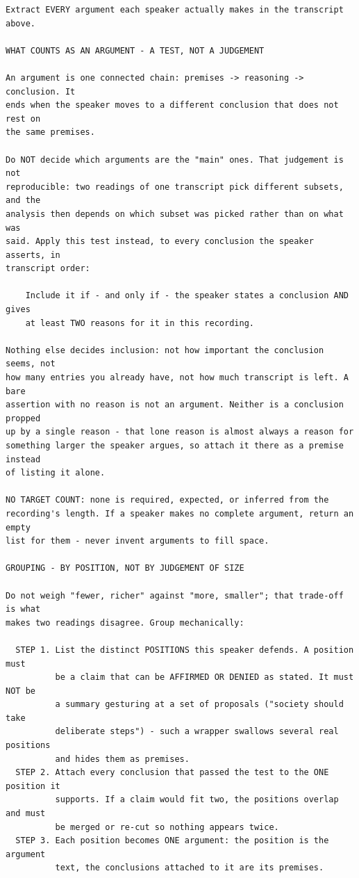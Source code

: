 \documentclass[a4paper, 12pt]{book}
\begin{document}
\begin{lstlisting}[basicstyle=\ttfamily\scriptsize,breaklines=true]
Extract EVERY argument each speaker actually makes in the transcript above.

WHAT COUNTS AS AN ARGUMENT - A TEST, NOT A JUDGEMENT

An argument is one connected chain: premises -> reasoning -> conclusion. It
ends when the speaker moves to a different conclusion that does not rest on
the same premises.

Do NOT decide which arguments are the "main" ones. That judgement is not
reproducible: two readings of one transcript pick different subsets, and the
analysis then depends on which subset was picked rather than on what was
said. Apply this test instead, to every conclusion the speaker asserts, in
transcript order:

    Include it if - and only if - the speaker states a conclusion AND gives
    at least TWO reasons for it in this recording.

Nothing else decides inclusion: not how important the conclusion seems, not
how many entries you already have, not how much transcript is left. A bare
assertion with no reason is not an argument. Neither is a conclusion propped
up by a single reason - that lone reason is almost always a reason for
something larger the speaker argues, so attach it there as a premise instead
of listing it alone.

NO TARGET COUNT: none is required, expected, or inferred from the
recording's length. If a speaker makes no complete argument, return an empty
list for them - never invent arguments to fill space.

GROUPING - BY POSITION, NOT BY JUDGEMENT OF SIZE

Do not weigh "fewer, richer" against "more, smaller"; that trade-off is what
makes two readings disagree. Group mechanically:

  STEP 1. List the distinct POSITIONS this speaker defends. A position must
          be a claim that can be AFFIRMED OR DENIED as stated. It must NOT be
          a summary gesturing at a set of proposals ("society should take
          deliberate steps") - such a wrapper swallows several real positions
          and hides them as premises.
  STEP 2. Attach every conclusion that passed the test to the ONE position it
          supports. If a claim would fit two, the positions overlap and must
          be merged or re-cut so nothing appears twice.
  STEP 3. Each position becomes ONE argument: the position is the argument
          text, the conclusions attached to it are its premises.


\end{lstlisting}
\end{document}
